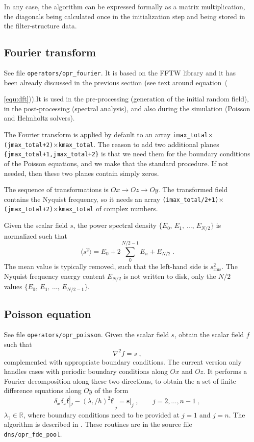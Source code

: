 In any case, the algorithm can be expressed formally as a matrix multiplication, the diagonals being calculated once in the initialization step and being stored in the filter-structure data.

\subsection{Fourier transform}

See file {\tt operators/opr\_fourier}. It is based on the FFTW library and it has been already discussed in the previous section (see text around equation~({\ref{equ:dft})).It is used in the pre-processing (generation of the   initial random field), in the post-processing (spectral analysis), and also during the simulation (Poisson and Helmholtz solvers).

The Fourier transform is applied by default to an array {\tt imax\_total}$\times${\tt(jmax\_total+2)}$\times${\tt kmax\_total}. The reason to add two additional planes {\tt \{jmax\_total+1,jmax\_total+2\}} is that we need them for the boundary conditions of the Poisson equations, and we make that the standard procedure. If not needed, then these two planes contain simply zeros.

The sequence of transformations is $Ox\rightarrow Oz\rightarrow Oy$. The transformed field contains the Nyquist frequency, so it needs an array {\tt(imax\_total/2+1)}$\times${\tt(jmax\_total+2)}$\times${\tt kmax\_total} of complex numbers.

Given the scalar field $s$, the power spectral density $\{E_0,\,E_1,\,\ldots,\,E_{N/2}\}$ is normalized such that
\begin{equation}
\langle s^2\rangle = E_0+2\sum_0^{N/2-1}E_n+E_{N/2} \;.
\end{equation}
The mean value is typically removed, such that the left-hand side is $s^2_\text{rms}$. The Nyquist frequency energy content $E_{N/2}$ is not written to disk, only the $N/2$ values $\{E_0,\,E_1,\,\ldots,\,E_{N/2-1}\}$.

\subsection{Poisson equation}

See file {\tt operators/opr\_poisson}. Given the scalar field $s$, obtain the scalar field $f$ such that
\begin{equation}
  \nabla^2 f= s \;,
\end{equation}
complemented with appropriate boundary conditions.  The current version only handles cases with periodic boundary conditions along $Ox$ and $Oz$. It performs a Fourier decomposition along these two directions, to obtain the a set of finite difference equations along $Oy$ of the form
\begin{equation}
  \delta_x \delta_x \mathbf{f}|_j - (\lambda_1/h)^2\mathbf{f}|_j=\mathbf{s}|_j
  \;,\qquad j=2,\ldots,n-1 \;,
\end{equation}
$\lambda_1\in\mathbb{R}$, where boundary conditions need to be provided at $j=1$ and $j=n$.  The algorithm is described in \cite{Mellado:2012}. These routines are in the source file {\tt dns/opr\_fde\_pool}.

}
